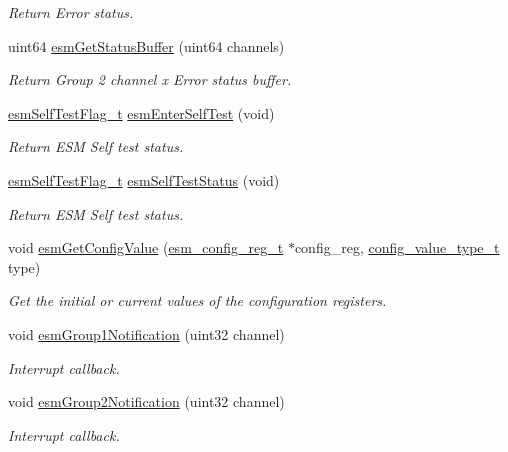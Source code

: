 \begin{DoxyCompactItemize}
\begin{DoxyCompactList}\small\item\em Return Error status. \end{DoxyCompactList}\item 
uint64 \mbox{\hyperlink{group__ESM_gace436f235f62ed75dd3c1b1374072b40}{esm\+Get\+Status\+Buffer}} (uint64 channels)
\begin{DoxyCompactList}\small\item\em Return Group 2 channel x Error status buffer. \end{DoxyCompactList}\item 
\mbox{\hyperlink{esm_8h_a622c861bffa9a22dacbc62fe8a2ff11f}{esm\+Self\+Test\+Flag\+\_\+t}} \mbox{\hyperlink{group__ESM_ga8dbfefa59cdb688306a7c4b93b7c435e}{esm\+Enter\+Self\+Test}} (void)
\begin{DoxyCompactList}\small\item\em Return E\+SM Self test status. \end{DoxyCompactList}\item 
\mbox{\hyperlink{esm_8h_a622c861bffa9a22dacbc62fe8a2ff11f}{esm\+Self\+Test\+Flag\+\_\+t}} \mbox{\hyperlink{group__ESM_ga6e558e0c5761321c3419e77642795d63}{esm\+Self\+Test\+Status}} (void)
\begin{DoxyCompactList}\small\item\em Return E\+SM Self test status. \end{DoxyCompactList}\item 
void \mbox{\hyperlink{group__ESM_ga0b2e9a4b3b1e4dd57f496bda7bbb854c}{esm\+Get\+Config\+Value}} (\mbox{\hyperlink{structesm__config__reg}{esm\+\_\+config\+\_\+reg\+\_\+t}} $\ast$config\+\_\+reg, \mbox{\hyperlink{sys__common_8h_a9daf9a5992391b058477d28d107ee5e2}{config\+\_\+value\+\_\+type\+\_\+t}} type)
\begin{DoxyCompactList}\small\item\em Get the initial or current values of the configuration registers. \end{DoxyCompactList}\item 
void \mbox{\hyperlink{group__ESM_ga47f1650e27c094120e414ad3332ea311}{esm\+Group1\+Notification}} (uint32 channel)
\begin{DoxyCompactList}\small\item\em Interrupt callback. \end{DoxyCompactList}\item 
void \mbox{\hyperlink{group__ESM_ga7d5d25716f0d945f9d5ae0e6ae387d67}{esm\+Group2\+Notification}} (uint32 channel)
\begin{DoxyCompactList}\small\item\em Interrupt callback. \end{DoxyCompactList}\end{DoxyCompactItemize}


